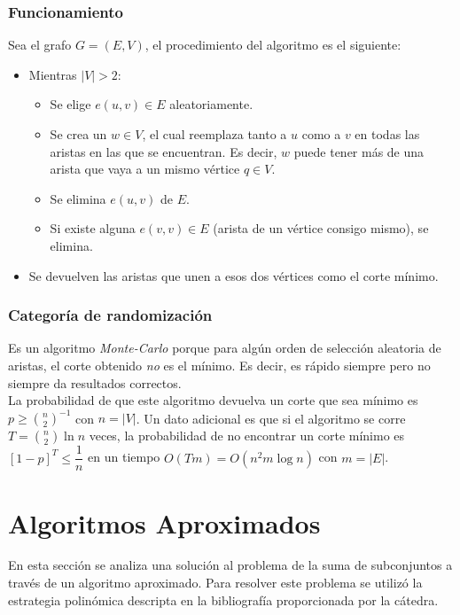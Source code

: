 \documentclass[a4paper, 10pt]{article}
\newcommand\tab[1][0.5cm]{\hspace*{#1}}
\begin{document}
            \subsubsection{Funcionamiento}
                Sea el grafo $G = (E, V)$, el procedimiento del algoritmo es el siguiente:
                \begin{itemize}
                    \item Mientras $|V| > 2$:
                    \begin{itemize}
                        \item Se elige $e(u, v) \in E$ aleatoriamente.
                        \item Se crea un $w \in V$, el cual reemplaza tanto a $u$ como a $v$ en todas
                        las aristas en las que se encuentran. Es decir, $w$ puede tener más de una arista
                        que vaya a un mismo vértice $q \in V$.
                        \item Se elimina $e(u, v)$ de $E$.
                        \item Si existe alguna $e(v, v) \in E$ (arista de un vértice consigo mismo), se elimina.
                    \end{itemize}
                    \item Se devuelven las aristas que unen a esos dos vértices como el corte mínimo.
                \end{itemize}
            \subsubsection{Categoría de randomización}
                    Es un algoritmo \emph{Monte-Carlo} porque para algún orden de selección aleatoria
                de aristas, el corte obtenido \emph{no} es el mínimo. Es decir, es rápido siempre pero no siempre
                da resultados correctos. \\
                \tab La probabilidad de que este algoritmo devuelva un corte que sea mínimo es $p \geqslant \binom{n}{2}^{-1}$
                con $n = |V|$. Un dato adicional es que si el algoritmo se corre $T = \binom{n}{2}\ln{n}$ veces,
                la probabilidad de no encontrar un corte mínimo es $[1-p]^T \leqslant \dfrac{1}{n}$ en un tiempo
                $O(Tm) = O(n^2m\log{n})$ con $m = |E|$.
    \newpage

    \section{Algoritmos Aproximados}
        \tab En esta sección se analiza una solución al problema de la suma de subconjuntos
        a través de un algoritmo aproximado. Para resolver este problema se utilizó la
        estrategia polinómica descripta en la bibliografía proporcionada por la cátedra.
\end{document}
